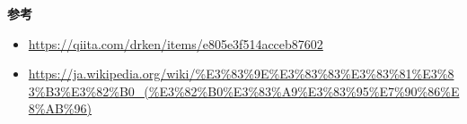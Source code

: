 \documentclass{jlreq}
\begin{document}
\textbf{参考} \\
\begin{itemize}
  \item \url{https://qiita.com/drken/items/e805e3f514acceb87602}
  \item \url{https://ja.wikipedia.org/wiki/%E3%83%9E%E3%83%83%E3%83%81%E3%83%B3%E3%82%B0_(%E3%82%B0%E3%83%A9%E3%83%95%E7%90%86%E8%AB%96)}
\end{itemize}
\end{document}
